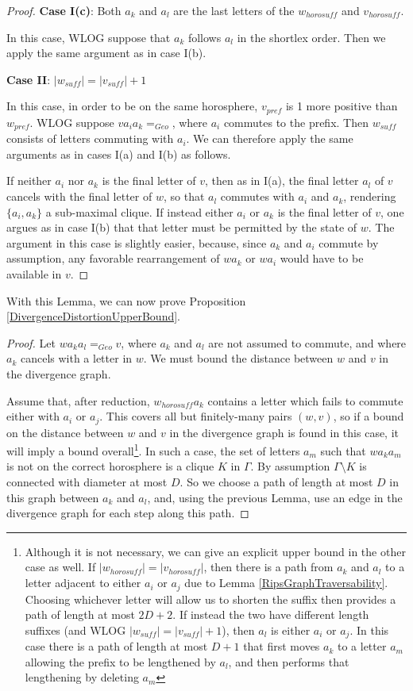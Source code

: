 \documentclass[10pt,a4paper]{amsart}
\theoremstyle{definition}
\theoremstyle{remark}
\begin{document}
\begin{proof}
		\textbf{Case I(c)}: Both $a_k$ and $a_l$ are the last letters of the $w_{horosuff}$ and $v_{horosuff}$. 
		
		In this case, WLOG suppose that $a_k$ follows $a_l$ in the shortlex order. Then we apply the same argument as in case I(b).		
		
		\textbf{Case II}: $|w_{suff}|=|v_{suff}|+1$
		
		In this case, in order to be on the same horosphere, $v_{pref}$ is 1 more positive than $w_{pref}$. WLOG suppose $va_ia_k=_{Geo}$, where $a_i$ commutes to the prefix. Then $w_{suff}$ consists of letters commuting with $a_i$. We can therefore apply the same arguments as in cases I(a) and I(b) as follows.
		
		If neither $a_i$ nor $a_k$ is the final letter of $v$, then as in I(a), the final letter $a_l$ of $v$ cancels with the final letter of $w$, so that $a_l$ commutes with $a_i$ and $a_k$, rendering $\{a_i, a_k\}$ a sub-maximal clique. If instead either $a_i$ or $a_k$ is the final letter of $v$, one argues as in case I(b) that that letter must be permitted by the state of $w$. The argument in this case is slightly easier, because, since $a_k$ and $a_i$ commute by assumption, any favorable rearrangement of $wa_k$ or $wa_i$ would have to be available in $v$. 
	\end{proof}
	
	With this Lemma, we can now prove Proposition \ref{DivergenceDistortionUpperBound}.
	
	\begin{proof}
		
		Let $wa_ka_l=_{Geo}v$, where $a_k$ and $a_l$ are not assumed to commute, and where $a_k$ cancels with a letter in $w$. We must bound the distance between $w$ and $v$ in the divergence graph.
		
		Assume that, after reduction, $w_{horosuff}a_k$ contains a letter which fails to commute either with $a_i$ or $a_j$. This covers all but finitely-many pairs $(w,v)$, so if a bound on the distance between $w$ and $v$ in the divergence graph is found in this case, it will imply a bound overall\footnote{Although it is not necessary, we can give an explicit upper bound in the other case as well. If $|w_{horosuff}|=|v_{horosuff}|$, then there is a path from $a_k$ and $a_l$ to a letter adjacent to either $a_i$ or $a_j$ due to Lemma \ref{RipsGraphTraversability}. Choosing whichever letter will allow us to shorten the suffix then provides a path of length at most $2D+2$. If instead the two have different length suffixes (and WLOG $|w_{suff}|=|v_{suff}|+1$), then $a_l$ is either $a_i$ or $a_j$. In this case there is a path of length at most $D+1$ that first moves $a_k$ to a letter $a_m$ allowing the prefix to be lengthened by $a_l$, and then performs that lengthening by deleting $a_m$}. In such a case, the set of letters $a_m$ such that $wa_ka_m$ is not on the correct horosphere is a clique $K$ in $\Gamma$. By assumption $\Gamma\setminus K$ is connected with diameter at most $D$. So we choose a path of length at most $D$ in this graph between $a_k$ and $a_l$,  and, using the previous Lemma, use an edge in the divergence graph for each step along this path.		
	\end{proof}
	
\end{document}
